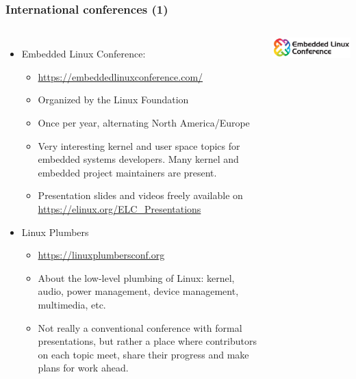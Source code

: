 \begin{frame}
  \frametitle{International conferences (1)}
  \begin{columns}
    \begin{itemize}
    \item Embedded Linux Conference:
      \begin{itemize}
      \item \url{https://embeddedlinuxconference.com/}
      \item Organized by the Linux Foundation
      \item Once per year, alternating North America/Europe
      \item Very interesting kernel and user space topics for embedded
            systems developers. Many kernel and embedded project maintainers are present.
      \item Presentation slides and videos freely available on
        \url{https://elinux.org/ELC_Presentations}
      \end{itemize}
    \item Linux Plumbers
      \begin{itemize}
      \item \url{https://linuxplumbersconf.org}
      \item About the low-level plumbing of Linux: kernel, audio, power
        management, device management, multimedia, etc.
      \item Not really a conventional conference with formal
        presentations, but rather a place where contributors on each topic
        meet, share their progress and make plans for work ahead.
      \end{itemize}
    \end{itemize}
    \begin{center}
      \includegraphics[width=\textwidth]{slides/linux-references/elc-logo.png}\\
      \vspace{1cm}

\end{center}
\end{columns}
\end{frame}

